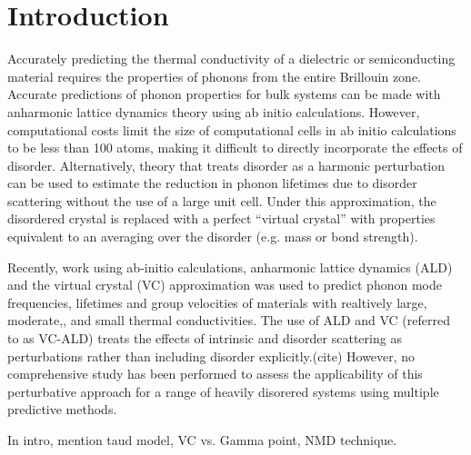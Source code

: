 \documentclass[aps,prb,twocolumn,superscriptaddress,preprintnumbers,amsmath,amssymb,floatfix]{revtex4}
\begin{document}
\section{\label{S:intro}Introduction}

Accurately predicting the thermal conductivity of a dielectric or 
semiconducting material requires the properties of phonons from the entire 
Brillouin zone. Accurate predictions of phonon properties for bulk systems 
can be made with anharmonic lattice dynamics theory using ab initio 
calculations.\cite{
broido_intrinsic_2007,ward_ab_2009,ward_intrinsic_2010,lindsay_thermal_2012,
garg_role_2011,
shiga_microscopic_2012,tian_phonon_2012,shiomi_thermal_2011}
However, computational costs limit the size of computational cells 
in ab initio calculations to be less than 100 atoms, making it difficult 
to directly incorporate the effects of disorder.
\cite{koker_thermal_2009,bao_first-principles_2012,
lindsay_thermal_2012,tian_phonon_2012,garg_role_2011}
Alternatively, theory 
that treats disorder as a harmonic perturbation can be used to estimate 
the reduction in phonon lifetimes due to disorder scattering without 
the use of a large unit cell.
\cite{tian_phonon_2012,garg_role_2011,lindsay_thermal_2012}
Under this approximation, the disordered 
crystal is replaced with a perfect “virtual crystal” with properties 
equivalent to an averaging over the disorder (e.g.  mass or bond 
strength).\cite{abeles_lattice_1963}

Recently, work using ab-initio calculations, anharmonic 
lattice dynamics (ALD) and the virtual crystal (VC) 
approximation was used to predict phonon mode frequencies, lifetimes and 
group velocities of materials with realtively
large,\cite{garg_role_2011,lindsay_thermal_2012} 
moderate,\cite{thermal_shiomi_2011}, and 
small \cite{tian_phonon_2012} 
thermal conductivities. The use of ALD and VC (referred to as VC-ALD) 
treats the effects of intrinsic and disorder scattering as perturbations 
rather than including disorder explicitly.(cite)
However, no comprehensive study has been performed 
to assess the applicability of this perturbative approach for a range 
of heavily disorered systems using multiple predictive methods.

In intro, mention taud model, VC vs. Gamma point, NMD technique.
\end{document}
